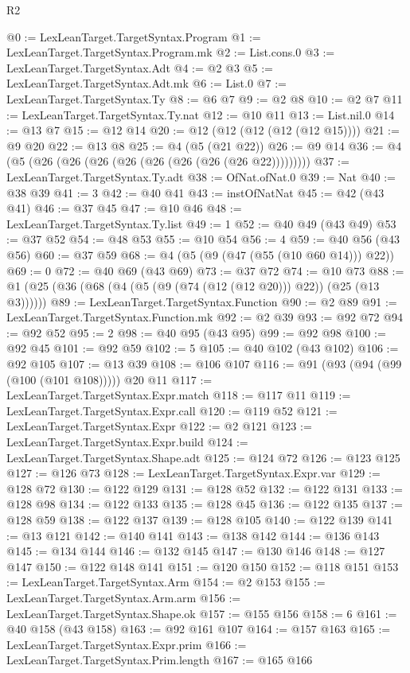 \begin{lexlean}{R2}
\begin{coremodule}
@0 := LexLeanTarget.TargetSyntax.Program
@1 := LexLeanTarget.TargetSyntax.Program.mk
@2 := List.cons.{0}
@3 := LexLeanTarget.TargetSyntax.Adt
@4 := @2 @3
@5 := LexLeanTarget.TargetSyntax.Adt.mk
@6 := List.{0}
@7 := LexLeanTarget.TargetSyntax.Ty
@8 := @6 @7
@9 := @2 @8
@10 := @2 @7
@11 := LexLeanTarget.TargetSyntax.Ty.nat
@12 := @10 @11
@13 := List.nil.{0}
@14 := @13 @7
@15 := @12 @14
@20 := @12 (@12 (@12 (@12 (@12 @15))))
@21 := @9 @20
@22 := @13 @8
@25 := @4 (@5 (@21 @22))
@26 := @9 @14
@36 := @4 (@5 (@26 (@26 (@26 (@26 (@26 (@26 (@26 (@26 @22)))))))))
@37 := LexLeanTarget.TargetSyntax.Ty.adt
@38 := OfNat.ofNat.{0}
@39 := Nat
@40 := @38 @39
@41 := 3
@42 := @40 @41
@43 := instOfNatNat
@45 := @42 (@43 @41)
@46 := @37 @45
@47 := @10 @46
@48 := LexLeanTarget.TargetSyntax.Ty.list
@49 := 1
@52 := @40 @49 (@43 @49)
@53 := @37 @52
@54 := @48 @53
@55 := @10 @54
@56 := 4
@59 := @40 @56 (@43 @56)
@60 := @37 @59
@68 := @4 (@5 (@9 (@47 (@55 (@10 @60 @14))) @22))
@69 := 0
@72 := @40 @69 (@43 @69)
@73 := @37 @72
@74 := @10 @73
@88 := @1 (@25 (@36 (@68 (@4 (@5 (@9 (@74 (@12 (@12 @20))) @22)) (@25 (@13 @3))))))
@89 := LexLeanTarget.TargetSyntax.Function
@90 := @2 @89
@91 := LexLeanTarget.TargetSyntax.Function.mk
@92 := @2 @39
@93 := @92 @72
@94 := @92 @52
@95 := 2
@98 := @40 @95 (@43 @95)
@99 := @92 @98
@100 := @92 @45
@101 := @92 @59
@102 := 5
@105 := @40 @102 (@43 @102)
@106 := @92 @105
@107 := @13 @39
@108 := @106 @107
@116 := @91 (@93 (@94 (@99 (@100 (@101 @108))))) @20 @11
@117 := LexLeanTarget.TargetSyntax.Expr.match
@118 := @117 @11
@119 := LexLeanTarget.TargetSyntax.Expr.call
@120 := @119 @52
@121 := LexLeanTarget.TargetSyntax.Expr
@122 := @2 @121
@123 := LexLeanTarget.TargetSyntax.Expr.build
@124 := LexLeanTarget.TargetSyntax.Shape.adt
@125 := @124 @72
@126 := @123 @125
@127 := @126 @73
@128 := LexLeanTarget.TargetSyntax.Expr.var
@129 := @128 @72
@130 := @122 @129
@131 := @128 @52
@132 := @122 @131
@133 := @128 @98
@134 := @122 @133
@135 := @128 @45
@136 := @122 @135
@137 := @128 @59
@138 := @122 @137
@139 := @128 @105
@140 := @122 @139
@141 := @13 @121
@142 := @140 @141
@143 := @138 @142
@144 := @136 @143
@145 := @134 @144
@146 := @132 @145
@147 := @130 @146
@148 := @127 @147
@150 := @122 @148 @141
@151 := @120 @150
@152 := @118 @151
@153 := LexLeanTarget.TargetSyntax.Arm
@154 := @2 @153
@155 := LexLeanTarget.TargetSyntax.Arm.arm
@156 := LexLeanTarget.TargetSyntax.Shape.ok
@157 := @155 @156
@158 := 6
@161 := @40 @158 (@43 @158)
@163 := @92 @161 @107
@164 := @157 @163
@165 := LexLeanTarget.TargetSyntax.Expr.prim
@166 := LexLeanTarget.TargetSyntax.Prim.length
@167 := @165 @166

\end{coremodule}
\end{lexlean}
